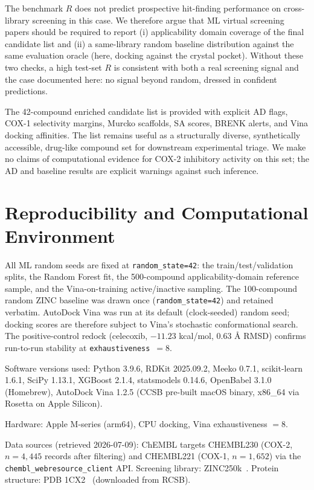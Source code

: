 \documentclass[11pt]{article}
\begin{document}
The benchmark $R$ does not predict prospective hit-finding performance on cross-library screening in this case. We therefore argue that ML virtual screening papers should be required to report (i) applicability domain coverage of the final candidate list and (ii) a same-library random baseline distribution against the same evaluation oracle (here, docking against the crystal pocket). Without these two checks, a high test-set $R$ is consistent with both a real screening signal and the case documented here: no signal beyond random, dressed in confident predictions.

The 42-compound enriched candidate list is provided with explicit AD flags, COX-1 selectivity margins, Murcko scaffolds, SA scores, BRENK alerts, and Vina docking affinities. The list remains useful as a structurally diverse, synthetically accessible, drug-like compound set for downstream experimental triage. We make no claims of computational evidence for COX-2 inhibitory activity on this set; the AD and baseline results are explicit warnings against such inference.

\section*{Reproducibility and Computational Environment}

All ML random seeds are fixed at \texttt{random\_state=42}: the train/test/validation splits, the Random Forest fit, the 500-compound applicability-domain reference sample, and the Vina-on-training active/inactive sampling. The 100-compound random ZINC baseline was drawn once (\texttt{random\_state=42}) and retained verbatim. AutoDock Vina was run at its default (clock-seeded) random seed; docking scores are therefore subject to Vina's stochastic conformational search. The positive-control redock (celecoxib, $-11.23$ kcal/mol, 0.63 \r{A} RMSD) confirms run-to-run stability at \texttt{exhaustiveness}~$=8$.

Software versions used: Python 3.9.6, RDKit 2025.09.2, Meeko 0.7.1, scikit-learn 1.6.1, SciPy 1.13.1, XGBoost 2.1.4, statsmodels 0.14.6, OpenBabel 3.1.0 (Homebrew), AutoDock Vina 1.2.5 (CCSB pre-built macOS binary, x86\_64 via Rosetta on Apple Silicon).

Hardware: Apple M-series (arm64), CPU docking, Vina exhaustiveness $=8$.

Data sources (retrieved 2026-07-09): ChEMBL targets CHEMBL230 (COX-2, $n = 4{,}445$ records after filtering) and CHEMBL221 (COX-1, $n = 1{,}652$) via the \texttt{chembl\_webresource\_client} API. Screening library: ZINC250k~\cite{irwin2020}. Protein structure: PDB 1CX2~\cite{kurumbail1996} (downloaded from RCSB).
\end{document}
